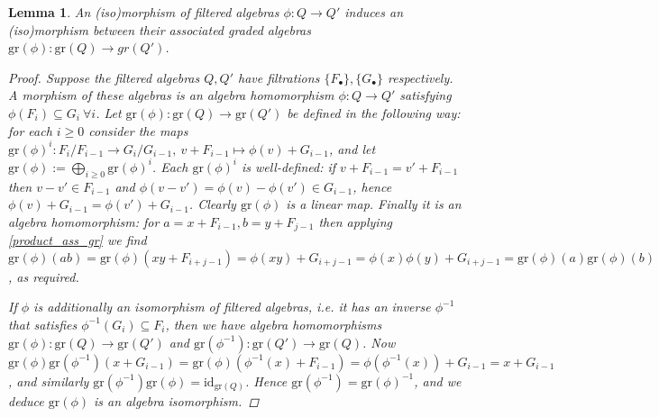 \documentclass[10pt]{article}
\newcommand{\bb}{\medbreak}
\newcommand{\nt}{\noindent}
\newcommand{\rt}{\xrightarrow{}}
\newcommand{\id}{\text{id}}
\newcommand{\gr}{\text{gr}}
\newtheorem{lemma}{Lemma}[section]
\theoremstyle{definition}
\begin{document}
\begin{lemma}\label{isom_filtered} An (iso)morphism of filtered algebras $\phi:Q\rt Q'$ induces an (iso)morphism between their associated graded algebras $\gr(\phi):\gr(Q)\rt gr(Q')$.
\begin{proof}
Suppose the filtered algebras $Q,Q'$ have filtrations $\{F_\bullet\},\{G_\bullet\}$ respectively. A morphism of these algebras is an algebra homomorphism $\phi:Q\rt Q'$ satisfying $\phi(F_i)\subseteq G_i\ \forall i$. Let $\gr(\phi):\gr(Q)\rt \gr(Q')$ be defined in the following way: for each $i\geq 0$ consider the maps $\gr(\phi)^i:F_i/F_{i-1}\rt G_i/G_{i-1},\ v+F_{i-1}\mapsto \phi(v)+G_{i-1}$, and let $\gr(\phi):=\bigoplus_{i\geq 0} \gr(\phi)^i$. Each $\gr(\phi)^i$ is well-defined: if $v+F_{i-1}=v'+F_{i-1}$ then $v-v'\in F_{i-1}$ and $\phi(v-v')=\phi(v)-\phi(v')\in G_{i-1}$, hence $\phi(v)+G_{i-1}=\phi(v')+G_{i-1}$. Clearly $\gr(\phi)$ is a linear map. Finally it is an algebra homomorphism: for $a=x+F_{i-1}, b=y+F_{j-1}$ then applying \eqref{product_ass_gr} we find $\gr(\phi)(ab)=\gr(\phi)(xy+F_{i+j-1})=\phi(xy)+G_{i+j-1}=\phi(x)\phi(y)+G_{i+j-1}=\gr(\phi)(a)\gr(\phi)(b)$, as required.\bb

\nt If $\phi$ is additionally an isomorphism of filtered algebras, i.e. it has an inverse $\phi^{-1}$ that satisfies $\phi^{-1}(G_i)\subseteq F_i$, then we have algebra homomorphisms $\gr(\phi):\gr(Q)\rt \gr(Q')$ and $\gr(\phi^{-1}):\gr(Q')\rt \gr(Q)$. Now $\gr(\phi)\gr(\phi^{-1})(x+G_{i-1})=\gr(\phi)(\phi^{-1}(x)+F_{i-1})=\phi(\phi^{-1}(x))+G_{i-1}=x+G_{i-1}$, and similarly $\gr(\phi^{-1})\gr(\phi)=\id_{\gr(Q)}$. Hence $\gr(\phi^{-1})=\gr(\phi)^{-1}$, and we deduce $\gr(\phi)$ is an algebra isomorphism.
\end{proof}
\end{lemma}
\end{document}
